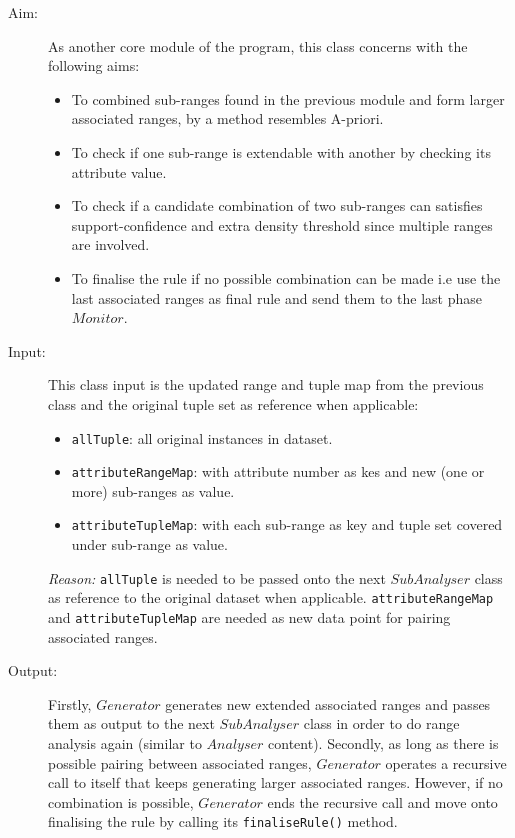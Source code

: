 \begin{description}

\item[Aim: ] As another core module of the program, this class concerns with the following aims:
\begin{itemize}
	\item{To combined sub-ranges found in the previous module and form larger associated ranges, by a method resembles A-priori.} 
	\item{To check if one sub-range is extendable with another by checking its attribute value.} 
	\item{To check if a candidate combination of two sub-ranges can satisfies support-confidence and extra density threshold since multiple ranges are involved.} 
	\item{To finalise the rule if no possible combination can be made i.e use the last associated ranges as final rule and send them to the last phase $Monitor$.} 
\end{itemize}

\item[Input: ] This class input is the updated range and tuple map from the previous class and the original tuple set as reference when applicable:
\begin{itemize}
	\item{\texttt{allTuple}:  all original instances in dataset.} 
	\item{\texttt{attributeRangeMap}: with attribute number as kes and new (one or more) sub-ranges as value.}
	\item{\texttt{attributeTupleMap}: with each sub-range as key and tuple set covered under sub-range as value.}
\end{itemize}

\textit{Reason: } \texttt{allTuple} is needed to be passed onto the next $SubAnalyser$ class as reference to the original dataset when applicable. \texttt{attributeRangeMap} and \texttt{attributeTupleMap} are needed as new data point for pairing associated ranges.

\item[Output: ] Firstly, $Generator$ generates new extended associated ranges and passes them as output to the next $SubAnalyser$ class in order to do range analysis again (similar to $Analyser$ content). Secondly, as long as there is possible pairing between associated ranges, $Generator$ operates a recursive call to itself that keeps generating larger associated ranges. However, if no combination is possible, $Generator$ ends the recursive call and move onto finalising the rule by calling its \texttt{finaliseRule()} method. 
  

\end{description}
